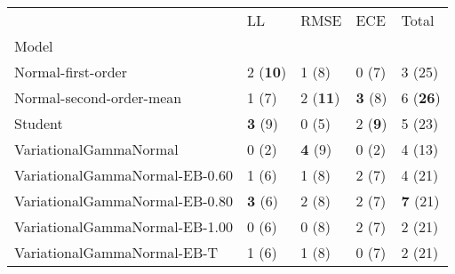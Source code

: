 \begin{tabular}{lllll}
\toprule
{} &               LL &             RMSE &             ECE &            Total \\
Model                          &                  &                  &                 &                  \\
\midrule
Normal-first-order             &  2 (\textbf{10}) &            1 (8) &           0 (7) &           3 (25) \\
Normal-second-order-mean       &            1 (7) &  2 (\textbf{11}) &  \textbf{3} (8) &  6 (\textbf{26}) \\
Student                        &   \textbf{3} (9) &            0 (5) &  2 (\textbf{9}) &           5 (23) \\
VariationalGammaNormal         &            0 (2) &   \textbf{4} (9) &           0 (2) &           4 (13) \\
VariationalGammaNormal-EB-0.60 &            1 (6) &            1 (8) &           2 (7) &           4 (21) \\
VariationalGammaNormal-EB-0.80 &   \textbf{3} (6) &            2 (8) &           2 (7) &  \textbf{7} (21) \\
VariationalGammaNormal-EB-1.00 &            0 (6) &            0 (8) &           2 (7) &           2 (21) \\
VariationalGammaNormal-EB-T    &            1 (6) &            1 (8) &           0 (7) &           2 (21) \\
\bottomrule
\end{tabular}

